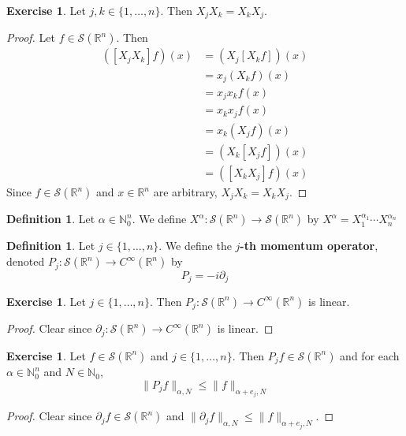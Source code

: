 \documentclass{book}
\theoremstyle{definition}
\newtheorem{defn}[definition]{Definition}
\newtheorem{ex}[definition]{Exercise}
\newcommand{\al}{\alpha}
\newcommand{\N}{\mathbb{N}}
\newcommand{\R}{\mathbb{R}}
\newcommand{\MS}{\mathcal{S}}
\DeclareMathOperator*{\0}{\mbf{0}}
\DeclareMathOperator*{\1}{\mbf{1}}
\newcommand{\p}{\partial}
\begin{document}
	\begin{ex}
		Let $j,k \in \{1, \ldots, n\}$. Then $X_jX_k = X_kX_j$.
	\end{ex}
	
	\begin{proof}
		Let $f \in \MS(\R^n)$. Then  
		\begin{align*}
			([X_jX_k] f) (x) 
			& = (X_j [X_k f]) (x) \\
			& = x_j (X_kf) (x) \\
			& = x_j x_k f(x) \\
			& = x_k x_j f(x) \\
			& = x_k (X_j f) (x) \\
			& = (X_k [X_j f]) (x) \\
			& = ([X_k X_j] f)(x)
		\end{align*}
		Since $f \in \MS(\R^n)$ and $x \in \R^n$ are arbitrary, $X_jX_k = X_kX_j$. 
	\end{proof}
	
	\begin{defn}
		Let $\al \in \N_0^n$. We define $X^{\al}: \MS(\R^n) \rightarrow \MS(\R^n)$ by 
		$X^{\al} = X_1^{\al_1} \cdots X_n^{\al_n}$ 
	\end{defn}

	\begin{defn}
		Let $j \in \{1, \ldots, n\}$. We define the \textbf{$j$-th momentum operator}, denoted $P_j: \MS(\R^n) \rightarrow C^{\infty}(\R^n)$ by 
		$$P_j = -i \p_j $$
	\end{defn}

	\begin{ex}
		Let $j \in \{1, \ldots, n\}$. Then $P_j: \MS(\R^n) \rightarrow C^{\infty}(\R^n)$ is linear. 
	\end{ex}

	\begin{proof}
		Clear since $\p_j: \MS(\R^n) \rightarrow C^{\infty}(\R^n)$ is linear.
	\end{proof}

	\begin{ex}
		Let $f \in \MS(\R^n)$ and $j \in \{1, \ldots, n\}$. Then $P_jf \in \MS(\R^n)$ and for each $\al \in \N_0^n$ and $N \in \N_0$, 
		\[
		\|P_jf \|_{\al, N} \leq \|f\|_{\al + e_j, N}
		\] 
	\end{ex}
	
	\begin{proof}
		Clear since $\p_j f \in \MS(\R^n)$ and $\|\p_jf \|_{\al, N} \leq \|f\|_{\al + e_j, N}$.
	\end{proof}
\end{document}
